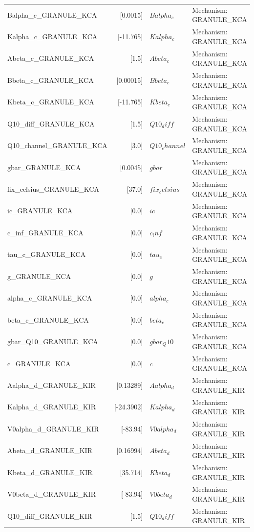 \begin{tabular}{|l|r|l|l|}
Balpha_c_GRANULE_KCA & [0.0015] & $Balpha_c$ & Mechanism: GRANULE_KCA \\
Kalpha_c_GRANULE_KCA & [-11.765] & $Kalpha_c$ & Mechanism: GRANULE_KCA \\
Abeta_c_GRANULE_KCA & [1.5] & $Abeta_c$ & Mechanism: GRANULE_KCA \\
Bbeta_c_GRANULE_KCA & [0.00015] & $Bbeta_c$ & Mechanism: GRANULE_KCA \\
Kbeta_c_GRANULE_KCA & [-11.765] & $Kbeta_c$ & Mechanism: GRANULE_KCA \\
Q10_diff_GRANULE_KCA & [1.5] & $Q10_diff$ & Mechanism: GRANULE_KCA \\
Q10_channel_GRANULE_KCA & [3.0] & $Q10_channel$ & Mechanism: GRANULE_KCA \\
gbar_GRANULE_KCA & [0.0045] & $gbar$ & Mechanism: GRANULE_KCA \\
fix_celsius_GRANULE_KCA & [37.0] & $fix_celsius$ & Mechanism: GRANULE_KCA \\
ic_GRANULE_KCA & [0.0] & $ic$ & Mechanism: GRANULE_KCA \\
c_inf_GRANULE_KCA & [0.0] & $c_inf$ & Mechanism: GRANULE_KCA \\
tau_c_GRANULE_KCA & [0.0] & $tau_c$ & Mechanism: GRANULE_KCA \\
g_GRANULE_KCA & [0.0] & $g$ & Mechanism: GRANULE_KCA \\
alpha_c_GRANULE_KCA & [0.0] & $alpha_c$ & Mechanism: GRANULE_KCA \\
beta_c_GRANULE_KCA & [0.0] & $beta_c$ & Mechanism: GRANULE_KCA \\
gbar_Q10_GRANULE_KCA & [0.0] & $gbar_Q10$ & Mechanism: GRANULE_KCA \\
c_GRANULE_KCA & [0.0] & $c$ & Mechanism: GRANULE_KCA \\
Aalpha_d_GRANULE_KIR & [0.13289] & $Aalpha_d$ & Mechanism: GRANULE_KIR \\
Kalpha_d_GRANULE_KIR & [-24.3902] & $Kalpha_d$ & Mechanism: GRANULE_KIR \\
V0alpha_d_GRANULE_KIR & [-83.94] & $V0alpha_d$ & Mechanism: GRANULE_KIR \\
Abeta_d_GRANULE_KIR & [0.16994] & $Abeta_d$ & Mechanism: GRANULE_KIR \\
Kbeta_d_GRANULE_KIR & [35.714] & $Kbeta_d$ & Mechanism: GRANULE_KIR \\
V0beta_d_GRANULE_KIR & [-83.94] & $V0beta_d$ & Mechanism: GRANULE_KIR \\
Q10_diff_GRANULE_KIR & [1.5] & $Q10_diff$ & Mechanism: GRANULE_KIR \\

\end{tabular}
